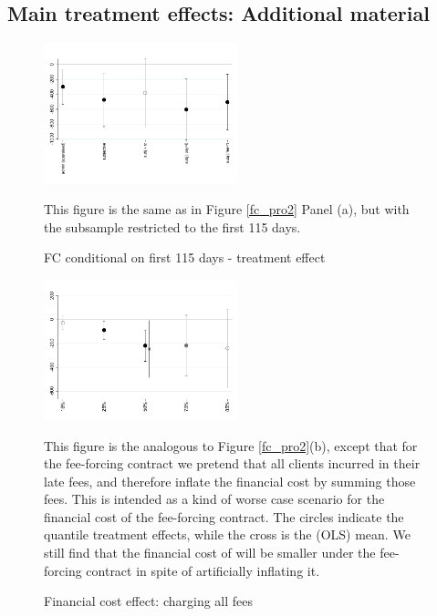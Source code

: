 \documentclass[oneside,11pt]{article}
\begin{document}
\newpage
\subsection{Main treatment effects: Additional material}

\vspace{.2in}



\begin{figure}[H]
        \caption{FC conditional on first 115 days - treatment effect}
    \label{fc_pro_2_115}
    \begin{center}
        \centering
        \includegraphics[width=0.50\textwidth]{Figuras/fc_te_115_pro_2.pdf}
    \end{center}
     \scriptsize This figure is the same as in Figure \ref{fc_pro2} Panel (a), but with the subsample restricted to the first 115 days.
\end{figure}



\begin{figure}[H]
        \caption{Financial cost effect: charging all fees}
    \label{fc_allfee}
    \begin{center}
        \centering
        \includegraphics[width=0.50\textwidth]{Figuras/fc_allfee_quantile_pro_2.pdf}
    \end{center}
    \scriptsize
     This figure is the analogous to Figure \ref{fc_pro2}(b), except that for the fee-forcing contract we pretend that all clients incurred in their late fees, and therefore inflate the financial cost by summing those fees. This is intended as a kind of worse case scenario for the financial cost of the fee-forcing contract. The circles indicate the quantile treatment effects, while the cross is the (OLS) mean. We still find that the financial cost of will be smaller under the fee-forcing contract in spite of artificially inflating it.
\end{figure}
\end{document}
